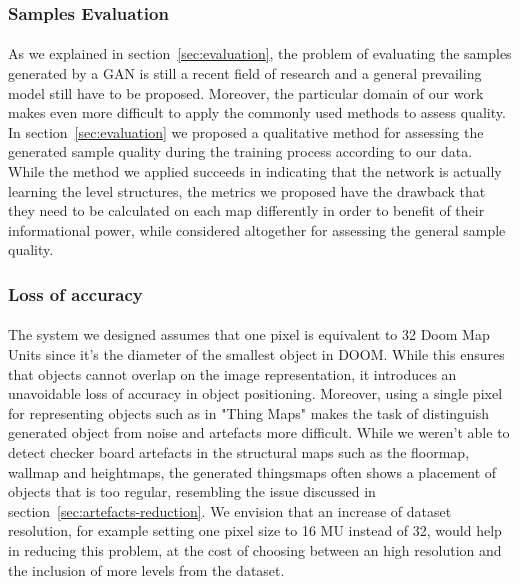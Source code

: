 \subsubsection{Samples Evaluation}
\paragraph{} As we explained in section~\ref{sec:evaluation}, the problem of evaluating the samples generated by a GAN is still a recent field of research and a general prevailing model still have to be proposed. Moreover, the particular domain of our work makes even more difficult to apply the commonly used methods to assess quality. In section~\ref{sec:evaluation} we proposed a qualitative method for assessing the generated sample quality during the training process according to our data. While the method we applied succeeds in indicating that the network is actually learning the level structures, the metrics we proposed have the drawback that they need to be calculated on each map differently in order to benefit of their informational power, while considered altogether for assessing the general sample quality. 

\subsubsection{Loss of accuracy}
\paragraph{} The system we designed assumes that one pixel is equivalent to 32 Doom Map Units since it's the diameter of the smallest object in DOOM. While this ensures that objects cannot overlap on the image representation, it introduces an unavoidable loss of accuracy in object positioning. Moreover, using a single pixel for representing objects such as in "Thing Maps" makes the task of distinguish generated object from noise and artefacts more difficult. While we weren't able to detect checker board artefacts in the structural maps such as the floormap, wallmap and heightmaps, the generated \glspl{thingsmap} often shows a placement of objects that is too regular, resembling the issue discussed in section~\ref{sec:artefacts-reduction}. We envision that an increase of dataset resolution, for example setting one pixel size to 16 MU instead of 32, would help in reducing this problem, at the cost of choosing between an high resolution and the inclusion of more levels from the dataset.

